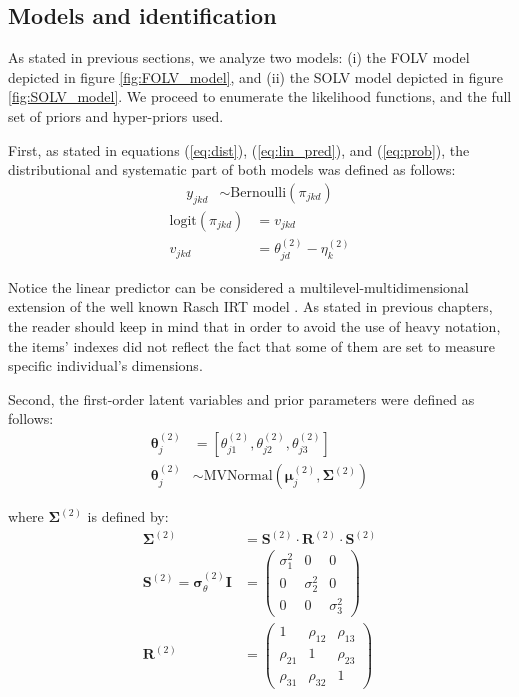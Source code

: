 \subsection{Models and identification}

As stated in previous sections, we analyze two models: (i) the FOLV model depicted in figure \ref{fig:FOLV_model}, and (ii) the SOLV model depicted in figure \ref{fig:SOLV_model}. We proceed to enumerate the likelihood functions, and the full set of priors and hyper-priors used. 

First, as stated in equations (\ref{eq:dist}), (\ref{eq:lin_pred}), and (\ref{eq:prob}), the distributional and systematic part of both models was defined as follows:
%
\begin{align}
	y_{jkd} &\sim \text{Bernoulli}( \pi_{jkd} )
\end{align}
%
\begin{align}
	\text{logit}( \pi_{jkd} ) &= v_{jkd} \\
	v_{jkd} &= \theta^{(2)}_{jd} - \eta^{(2)}_{k}
\end{align}

Notice the linear predictor can be considered a multilevel-multidimensional extension of the well known Rasch IRT model \cite{Rasch_1980}. As stated in previous chapters, the reader should keep in mind that in order to avoid the use of heavy notation, the items' indexes did not reflect the fact that some of them are set to measure specific individual's dimensions. 

Second, the first-order latent variables and prior parameters were defined as follows:
%
\begin{align}
	\boldsymbol{\theta}^{(2)}_{j} &= \left[ \theta_{j1}^{(2)}, \theta_{j2}^{(2)}, \theta_{j3}^{(2)} \right] \\
	\boldsymbol{\theta}^{(2)}_{j} &\sim \text{MVNormal} \left( \boldsymbol{\mu}^{(2)}_{j}, \boldsymbol{\Sigma}^{(2)} \right)
\end{align}

where $\boldsymbol{\Sigma}^{(2)}$ is defined by:
%
\begin{align}
	\boldsymbol{\Sigma}^{(2)} &= \boldsymbol{S}^{(2)} \cdot \boldsymbol{R}^{(2)} \cdot \boldsymbol{S}^{(2)} \\
	\boldsymbol{S}^{(2)} = \pmb{\sigma}^{(2)}_{\theta} \mathbf{I} &= 
	\begin{pmatrix}
		\sigma^{2}_{1}	& 0 			 	& 0 				\\
		0 				& \sigma^{2}_{2} 	& 0 				\\
		0 				& 0					& \sigma^{2}_{3} 
	\end{pmatrix} \\
	\boldsymbol{R}^{(2)} &= 
	\begin{pmatrix}
		1			& \rho_{12} & \rho_{13} 	\\
		\rho_{21} 	& 1 		& \rho_{23} 	\\
		\rho_{31} 	& \rho_{32}	& 1	
	\end{pmatrix} 
\end{align}

